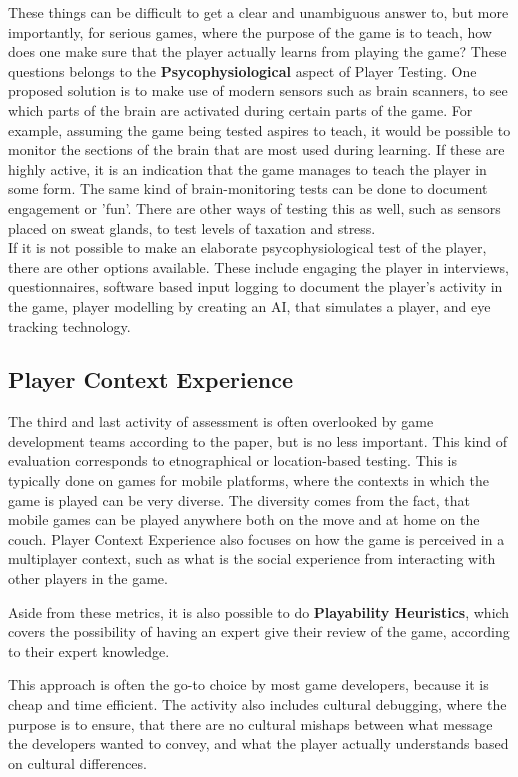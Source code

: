 These things can be difficult to get a clear and unambiguous answer to, but more importantly, for serious games, where the purpose of the game is to teach, how does one make sure that the player actually learns from playing the game?
These questions belongs to the \textbf{Psycophysiological} aspect of Player Testing.
One proposed solution is to make use of modern sensors such as brain scanners, to see which parts of the brain are activated during certain parts of the game.
For example, assuming the game being tested aspires to teach, it would be possible to monitor the sections of the brain that are most used during learning.
If these are highly active, it is an indication that the game manages to teach the player in some form.
The same kind of brain-monitoring tests can be done to document engagement or 'fun'.
There are other ways of testing this as well, such as sensors placed on sweat glands, to test levels of taxation and stress.\\

If it is not possible to make an elaborate psycophysiological test of the player, there are other options available.
These include engaging the player in interviews, questionnaires, software based input logging to document the player's activity in the game, player modelling by creating an AI, that simulates a player, and eye tracking technology.\cite{gxmethod}


\subsection{Player Context Experience}
The third and last activity of assessment is often overlooked by game development teams according to the paper, but is no less important.
This kind of evaluation corresponds to etnographical or location-based testing.
This is typically done on games for mobile platforms, where the contexts in which the game is played can be very diverse.
The diversity comes from the fact, that mobile games can be played anywhere both on the move and at home on the couch.
Player Context Experience also focuses on how the game is perceived in a multiplayer context, such as what is the social experience from interacting with other players in the game.

Aside from these metrics, it is also possible to do \textbf{Playability Heuristics}, which covers the possibility of having an expert give their review of the game, according to their expert knowledge.

This approach is often the go-to choice by most game developers, because it is cheap and time efficient.
The activity also includes cultural debugging, where the purpose is to ensure, that there are no cultural mishaps between what message the developers wanted to convey, and what the player actually understands based on cultural differences.\cite{gxmethod}
